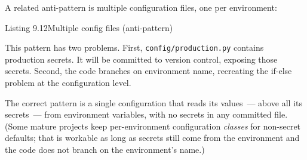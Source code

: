 A related anti-pattern is multiple configuration files, one per environment:

\begin{codeboxcap}[short]{\textcolor{accent}{Listing 9.12}\enspace Multiple config files (anti-pattern)}

\begin{Shaded}
\begin{Highlighting}[]
\OperatorTok{=} 
\OperatorTok{=} 
\OperatorTok{=} 

\OperatorTok{=} 
\OperatorTok{=} 
\OperatorTok{=} 

\OperatorTok{=}\NormalTok{, }\NormalTok{)}
\OperatorTok{==} \NormalTok{:}
     \OperatorTok{*}
\OperatorTok{==} \NormalTok{:}
     \OperatorTok{*}
\end{Highlighting}
\end{Shaded}

\end{codeboxcap}

\noindent{}This pattern has two problems. First, \texttt{config/}\allowbreak{}\texttt{production.py} contains production secrets. It will be committed to version control, exposing those secrets. Second, the code branches on environment name, recreating the if-else problem at the configuration level.

The correct pattern is a single configuration that reads its values~--- above all its secrets~--- from environment variables, with no secrets in any committed file. (Some mature projects keep per-environment configuration \emph{classes} for non-secret defaults; that is workable as long as secrets still come from the environment and the code does not branch on the environment's name.)

\label{09-configuration-coupling:configuration-coupling-checklist}

